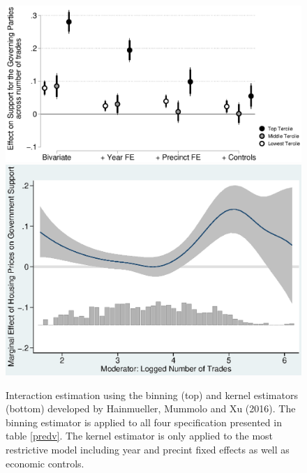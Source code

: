 \documentclass[12pt,a4paper]{article}
\begin{document}
			
			\begin{figure}
				\includegraphics[width=1\textwidth]{../figures/localactivity_sup.eps}
				\includegraphics[width=1\textwidth]{../figures/localactivity_sup2.eps}
				
				\caption{Interaction estimation using the binning (top) and kernel estimators (bottom) developed by Hainmueller, Mummolo and Xu (2016). The binning estimator is applied to all four specification presented in table \ref{predv}. The kernel estimator is only applied to the most restrictive model including year and precint fixed effects as well as economic controls.}
				\label{terciles}
			\end{figure}
			
			
			
			
			
		
\end{document}
